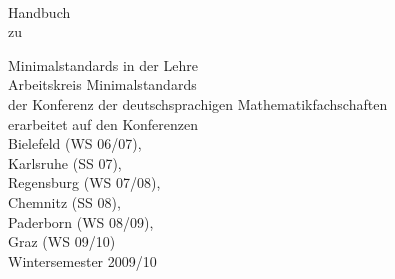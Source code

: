\frontmatter
{}
\newpage
\thispagestyle{empty}~
\newpage

\begin{titlepage}
\begin{flushright}\sffamily
	\vspace*{1cm}
	{\Huge{Handbuch}}\\
	\vspace{2.0cm}
	{\large zu}\bigskip\par
	{\huge{Minimalstandards in der Lehre}} \\
	\vspace{2ex}
	\vfill
	{\large{Arbeitskreis Minimalstandards}\smallskip \\ 
	{\large{der Konferenz der deutschsprachigen Mathematikfachschaften}}\\
	\vspace{1cm}
	erarbeitet auf den Konferenzen}\smallskip\\	
	{\small
	Bielefeld (WS 06/07), \\
	Karlsruhe (SS 07),  \\
	Regensburg (WS 07/08), \\
	Chemnitz (SS 08), \\
	Paderborn (WS 08/09),\\
	Graz (WS 09/10)
	}\\
	\vspace{3cm}
	{\Large Wintersemester 2009/10}\\
	\vspace{14ex}
\end{flushright}
\end{titlepage}